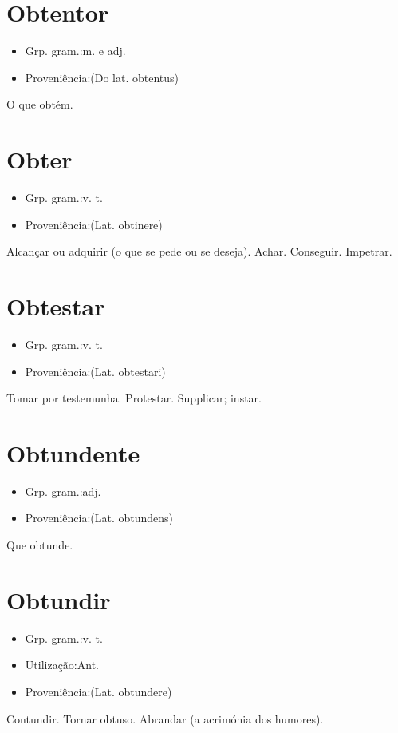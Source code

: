 \section{Obtentor}
\begin{itemize}
\item {Grp. gram.:m.  e  adj.}
\end{itemize}
\begin{itemize}
\item {Proveniência:(Do lat. \textunderscore obtentus\textunderscore )}
\end{itemize}
O que obtém.
\section{Obter}
\begin{itemize}
\item {Grp. gram.:v. t.}
\end{itemize}
\begin{itemize}
\item {Proveniência:(Lat. \textunderscore obtinere\textunderscore )}
\end{itemize}
Alcançar ou adquirir (o que se pede ou se deseja).
Achar.
Conseguir.
Impetrar.
\section{Obtestar}
\begin{itemize}
\item {Grp. gram.:v. t.}
\end{itemize}
\begin{itemize}
\item {Proveniência:(Lat. \textunderscore obtestari\textunderscore )}
\end{itemize}
Tomar por testemunha.
Protestar.
Supplicar; instar.
\section{Obtundente}
\begin{itemize}
\item {Grp. gram.:adj.}
\end{itemize}
\begin{itemize}
\item {Proveniência:(Lat. \textunderscore obtundens\textunderscore )}
\end{itemize}
Que obtunde.
\section{Obtundir}
\begin{itemize}
\item {Grp. gram.:v. t.}
\end{itemize}
\begin{itemize}
\item {Utilização:Ant.}
\end{itemize}
\begin{itemize}
\item {Proveniência:(Lat. \textunderscore obtundere\textunderscore )}
\end{itemize}
Contundir.
Tornar obtuso.
Abrandar (a acrimónia dos humores).
